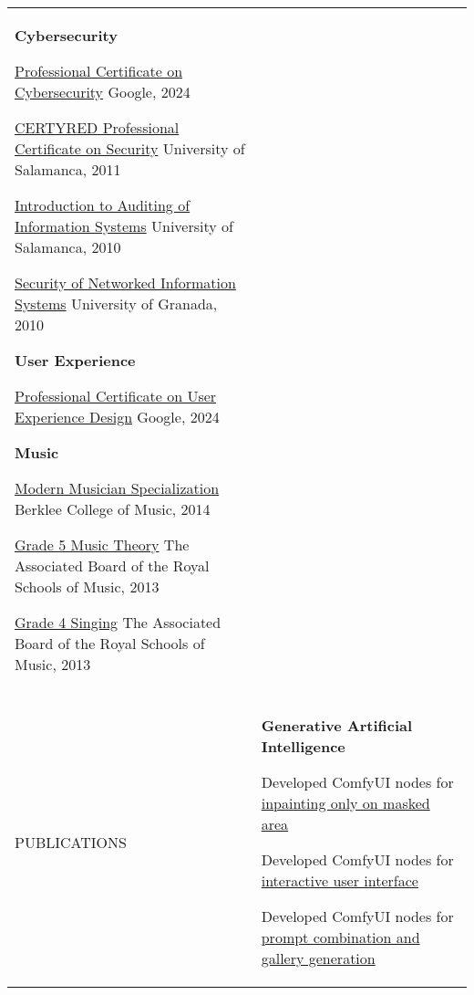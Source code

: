 \documentclass[letterpaper,10pt,oneside]{article}
\newcommand{\DatestampY}[1]{#1}
\newcommand{\itemspacingtwo}{\vspace{0.08cm}}
\newcommand{\sref}[2]{%
    \href{https://0/local/attachments/#1}{\textcolor{hiddenblue}{#2}}%
}
\newenvironment{body}
{\par\par
\begin{longtable}{p{0.145\textwidth}p{0.81\textwidth}}}
{\par\end{longtable}\par}
\renewcommand{\section}[3]{\\[-0.2cm]\pdfbookmark[2]{#2}{#3}\\%
\raggedleft  %
{\fontsize{9.5pt}{9.5pt}\selectfont\bfseries\raggedright%
\MakeUppercase{#1}}&}
\begin{document}
\begin{body}
\textbf{Cybersecurity}
\begin{comp}
\item \sref{Certificate-Coursera-Google-Cybersecurity.pdf}{Professional Certificate on Cybersecurity} \textemdash{ }Google, \DatestampY{2024}
\item \sref{Certificate-Certyred.pdf}{CERTYRED Professional Certificate on Security} \textemdash{ }University of Salamanca, \DatestampY{2011}
\item \sref{Course-Salamanca-Auditing.pdf}{Introduction to Auditing of Information Systems} \textemdash{ }University of Salamanca, \DatestampY{2010}
\item \sref{Course-FE-Security.pdf}{Security of Networked Information Systems} \textemdash{ }University of Granada, \DatestampY{2010}
\end{comp}
\itemspacingtwo

\textbf{User Experience}
\begin{comp}
\item \sref{Certificate-Coursera-Google-UX-Design.pdf}{Professional Certificate on User Experience Design} \textemdash{ }Google, \DatestampY{2024}
\end{comp}
\itemspacingtwo

\textbf{Music}
\begin{comp}
\item \sref{Diploma-BerkleeCollege-ModernMusician.pdf}{Modern Musician Specialization} \textemdash{ }Berklee College of Music, \DatestampY{2014}
\item \sref{Diploma-ABRSM-MusicTheory5.pdf}{Grade 5 Music Theory} \textemdash{ }The Associated Board of the Royal Schools of Music, \DatestampY{2013}
\item \sref{Diploma-ABRSM-SingingGrade4.pdf}{Grade 4 Singing} \textemdash{ }The Associated Board of the Royal Schools of Music, \DatestampY{2013}
\end{comp}
\itemspacingtwo


\section{Publications}{Publications}{PDF:Publications}
\textbf{Generative Artificial Intelligence}
\begin{comp}
\item Developed ComfyUI nodes for \href{https://github.com/lquesada/ComfyUI-Inpaint-CropAndStitch}{inpainting only on masked area}
\item Developed ComfyUI nodes for \href{https://github.com/lquesada/ComfyUI-Interactive}{interactive user interface}
\item Developed ComfyUI nodes for \href{https://github.com/lquesada/ComfyUI-Prompt-Combinator}{prompt combination and gallery generation}
\end{comp}
\itemspacingtwo


\end{body}
\end{document}
